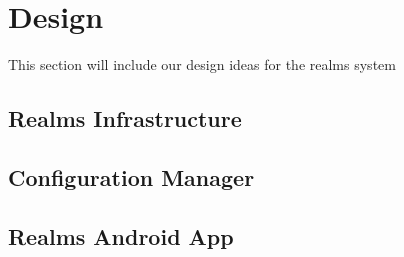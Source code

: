 \section{Design} %
\label{sec:design}
This section will include our design ideas for the realms system

\subsection{Realms Infrastructure} %
\label{sub:realms_infrastructure}


\subsection{Configuration Manager} %
\label{sub:configuration_manager}


\subsection{Realms Android App} %
\label{sub:realms_android_app}

